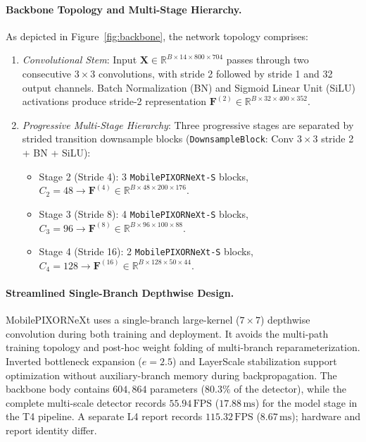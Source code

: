 \paragraph{Backbone Topology and Multi-Stage Hierarchy.}
As depicted in Figure~\ref{fig:backbone}, the network topology comprises:
\begin{enumerate}
    \item \textit{Convolutional Stem}: Input $\mathbf{X} \in \mathbb{R}^{B \times 14 \times 800 \times 704}$ passes through two consecutive $3 \times 3$ convolutions, with stride 2 followed by stride 1 and 32 output channels. Batch Normalization (BN) and Sigmoid Linear Unit (SiLU) activations produce stride-2 representation $\mathbf{F}^{(2)} \in \mathbb{R}^{B \times 32 \times 400 \times 352}$.
    \item \textit{Progressive Multi-Stage Hierarchy}: Three progressive stages are separated by strided transition downsample blocks (\texttt{DownsampleBlock}: Conv $3 \times 3$ stride 2 + BN + SiLU):
    \begin{itemize}
        \item Stage 2 (Stride 4): 3 \texttt{MobilePIXORNeXt-S} blocks, $C_2 = 48 \rightarrow \mathbf{F}^{(4)} \in \mathbb{R}^{B \times 48 \times 200 \times 176}$.
        \item Stage 3 (Stride 8): 4 \texttt{MobilePIXORNeXt-S} blocks, $C_3 = 96 \rightarrow \mathbf{F}^{(8)} \in \mathbb{R}^{B \times 96 \times 100 \times 88}$.
        \item Stage 4 (Stride 16): 2 \texttt{MobilePIXORNeXt-S} blocks, $C_4 = 128 \rightarrow \mathbf{F}^{(16)} \in \mathbb{R}^{B \times 128 \times 50 \times 44}$.
    \end{itemize}
\end{enumerate}

\paragraph{Streamlined Single-Branch Depthwise Design.}
MobilePIXORNeXt uses a single-branch large-kernel ($7 \times 7$) depthwise convolution during both training and deployment. It avoids the multi-path training topology and post-hoc weight folding of multi-branch reparameterization. Inverted bottleneck expansion ($e=2.5$) and LayerScale stabilization support optimization without auxiliary-branch memory during backpropagation. The backbone body contains $604,864$ parameters ($80.3\%$ of the detector), while the complete multi-scale detector records $55.94\,\text{FPS}$ ($17.88\,\text{ms}$) for the model stage in the T4 pipeline. A separate L4 report records $115.32\,\text{FPS}$ ($8.67\,\text{ms}$); hardware and report identity differ.

